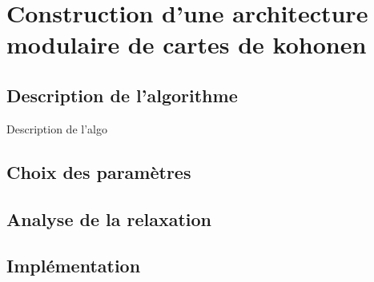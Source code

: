 \chapter{Construction d'une architecture modulaire de cartes de kohonen}


\section{Description de l'algorithme}

Description de l'algo

\section{Choix des paramètres}


\section{Analyse de la relaxation}


\section{Implémentation}
